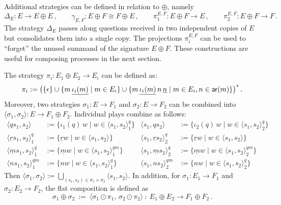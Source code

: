 Additional strategies
can be defined in relation to $\oplus$, namely
\[
  \Delta_E : E \rightarrow E \oplus E \,,
  \qquad
  \gamma_{E,F} : E \oplus F \cong F \oplus E \,,
  \qquad
  \pi_1^{E,F} : E \oplus F \rightarrow E \,,
  \qquad
  \pi_2^{E,F} : E \oplus F \rightarrow F \,.
\]
The strategy $\Delta_E$ passes along
questions received in two independent copies of $E$
but consolidates them into a single copy.
The projections $\pi_i^{E,F}$
can be used to ``forget'' the unused summand
of the signature $E \oplus F$.
These constructions are useful
for composing processes in the next section.

\begin{definition}
  \label{def:strat:flat-comp}
  The strategy $\pi_i : E_1 \oplus E_2 \rightarrow E_i$
  can be defined as:
  \[
    \pi_i := \bigl(
      \{ \epsilon \} \cup
      \{ m \, \underline{\iota_i(m)} \mid m \in E_i \} \cup
      \{ m \, \underline{\iota_i(m)} \, n \, \underline{n} \mid
      m \in E_i, n \in  \mathsf{ar} (m) \}
    \big)^*
    \,.
  \]
  Moreover,
  two strategies
  $\sigma_1 : E \rightarrow F_1$ and
  $\sigma_2 : E \rightarrow F_2$
  can be combined into
  $\langle \sigma_1, \sigma_2 \rangle : E \rightarrow F_1 \oplus F_2$.
  Individual plays combine as follows:
  \begin{align*}
    \langle qs_1 , s_2 \rangle &:=
    \{ \iota_1(q) \, w \mid w \in \langle s_1, s_2 \rangle^q_1 \} &
    \langle s_1 , qs_2 \rangle &:=
    \{ \iota_2(q) \, w \mid w \in \langle s_1, s_2 \rangle^q_2 \}
    \\
    \langle \underline{r} s_1, s_2 \rangle_1^q &:=
    \{ \underline{r} w \mid w \in \langle s_1, s_2 \rangle \} &
    \langle s_1, \underline{r} s_2 \rangle_2^q &:=
    \{ \underline{r} w \mid w \in \langle s_1, s_2 \rangle \}
    \\
    \langle \underline{m} s_1, s_2 \rangle_1^q &:=
    \{ \underline{m} w \mid w \in \langle s_1, s_2 \rangle^{qm}_1 \} &
    \langle s_1, \underline{m} s_2 \rangle_2^q &:=
    \{ \underline{m} w \mid w \in \langle s_1, s_2 \rangle^{qm}_2 \}
    \\
    \langle n s_1, s_2 \rangle^{qm}_1 &:=
    \{ n w \mid w \in \langle s_1, s_2 \rangle^q_1 \} &
    \langle s_1, n s_2 \rangle^{qm}_2 &:=
    \{ n w \mid w \in \langle s_1, s_2 \rangle^q_2 \}
  \end{align*}
  Then
  $\langle \sigma_1, \sigma_2 \rangle :=
  \bigcup_{(s_1, s_2) \in \sigma_1 \times \sigma_2}
  \langle s_1, s_2 \rangle$.
  In addition,
  for $\sigma_1 : E_1 \rightarrow F_1$ and
  $\sigma_2 : E_2 \rightarrow F_2$,
  the flat composition is defined as
  \[
    \sigma_1 \oplus \sigma_2 \: := \:
    \langle \sigma_1 \odot \pi_1, \, \sigma_2 \odot \pi_2 \rangle
    \: : \:
    E_1 \oplus E_2 \rightarrow F_1 \oplus F_2
    \,.
  \]
\end{definition}

